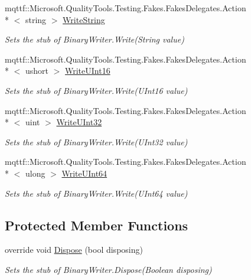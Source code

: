 \begin{DoxyCompactItemize}
mqttf\-::\-Microsoft.\-Quality\-Tools.\-Testing.\-Fakes.\-Fakes\-Delegates.\-Action\\*
$<$ string $>$ \hyperlink{class_system_1_1_i_o_1_1_fakes_1_1_stub_binary_writer_abf71f0980261443bac091400ce1e2cee}{Write\-String}
\begin{DoxyCompactList}\small\item\em Sets the stub of Binary\-Writer.\-Write(\-String value)\end{DoxyCompactList}\item 
mqttf\-::\-Microsoft.\-Quality\-Tools.\-Testing.\-Fakes.\-Fakes\-Delegates.\-Action\\*
$<$ ushort $>$ \hyperlink{class_system_1_1_i_o_1_1_fakes_1_1_stub_binary_writer_adc40a1ae6c9adaf93435167e220b5b87}{Write\-U\-Int16}
\begin{DoxyCompactList}\small\item\em Sets the stub of Binary\-Writer.\-Write(\-U\-Int16 value)\end{DoxyCompactList}\item 
mqttf\-::\-Microsoft.\-Quality\-Tools.\-Testing.\-Fakes.\-Fakes\-Delegates.\-Action\\*
$<$ uint $>$ \hyperlink{class_system_1_1_i_o_1_1_fakes_1_1_stub_binary_writer_a0e0a04f3ca4857608728d00600542551}{Write\-U\-Int32}
\begin{DoxyCompactList}\small\item\em Sets the stub of Binary\-Writer.\-Write(\-U\-Int32 value)\end{DoxyCompactList}\item 
mqttf\-::\-Microsoft.\-Quality\-Tools.\-Testing.\-Fakes.\-Fakes\-Delegates.\-Action\\*
$<$ ulong $>$ \hyperlink{class_system_1_1_i_o_1_1_fakes_1_1_stub_binary_writer_a9f6288c6ac3944062b0b9d9a741ba4bb}{Write\-U\-Int64}
\begin{DoxyCompactList}\small\item\em Sets the stub of Binary\-Writer.\-Write(\-U\-Int64 value)\end{DoxyCompactList}\end{DoxyCompactItemize}
\subsection*{Protected Member Functions}
\begin{DoxyCompactItemize}
\item 
override void \hyperlink{class_system_1_1_i_o_1_1_fakes_1_1_stub_binary_writer_a8fcb3710c9d9d42c3b1cf3b294d1503c}{Dispose} (bool disposing)
\begin{DoxyCompactList}\small\item\em Sets the stub of Binary\-Writer.\-Dispose(\-Boolean disposing)\end{DoxyCompactList}\end{DoxyCompactItemize}
